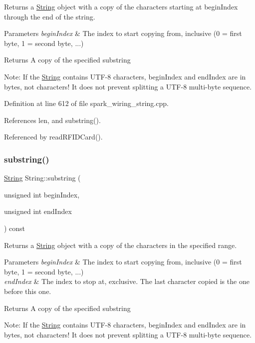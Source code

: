 Returns a \hyperlink{class_string}{String} object with a copy of the characters starting at begin\+Index through the end of the string. 


\begin{DoxyParams}{Parameters}
{\em begin\+Index} & The index to start copying from, inclusive (0 = first byte, 1 = second byte, ...)\\
\hline
\end{DoxyParams}
\begin{DoxyReturn}{Returns}
A copy of the specified substring
\end{DoxyReturn}
Note\+: If the \hyperlink{class_string}{String} contains U\+T\+F-\/8 characters, begin\+Index and end\+Index are in bytes, not characters! It does not prevent splitting a U\+T\+F-\/8 multi-\/byte sequence. 

Definition at line 612 of file spark\+\_\+wiring\+\_\+string.\+cpp.



References len, and substring().



Referenced by read\+R\+F\+I\+D\+Card().

\mbox{\label{class_string_ad04cc1c85089951dc3a182b4397a9f40}} 
\subsubsection{\texorpdfstring{substring()}{substring()}\hspace{0.1cm}{\footnotesize\ttfamily [2/2]}}
{\footnotesize\ttfamily \hyperlink{class_string}{String} String\+::substring (\begin{DoxyParamCaption}\item[{unsigned int}]{begin\+Index,  }\item[{unsigned int}]{end\+Index }\end{DoxyParamCaption}) const}



Returns a \hyperlink{class_string}{String} object with a copy of the characters in the specified range. 


\begin{DoxyParams}{Parameters}
{\em begin\+Index} & The index to start copying from, inclusive (0 = first byte, 1 = second byte, ...)\\
\hline
{\em end\+Index} & The index to stop at, exclusive. The last character copied is the one before this one.\\
\hline
\end{DoxyParams}
\begin{DoxyReturn}{Returns}
A copy of the specified substring
\end{DoxyReturn}
Note\+: If the \hyperlink{class_string}{String} contains U\+T\+F-\/8 characters, begin\+Index and end\+Index are in bytes, not characters! It does not prevent splitting a U\+T\+F-\/8 multi-\/byte sequence. 

